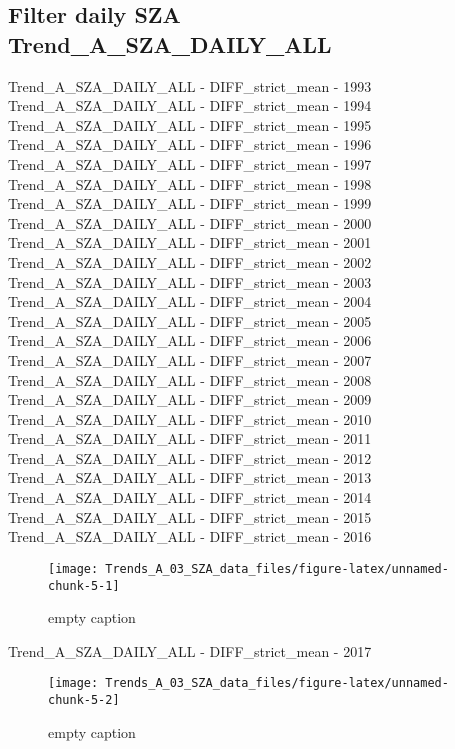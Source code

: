 \documentclass[
  10pt,
  a4paper,oneside]{article}
\begin{document}
\FloatBarrier

\hypertarget{filter-daily-sza-trend_a_sza_daily_all}{%
\subsection{Filter daily SZA Trend\_A\_SZA\_DAILY\_ALL}\label{filter-daily-sza-trend_a_sza_daily_all}}

Trend\_A\_SZA\_DAILY\_ALL - DIFF\_strict\_mean - 1993
Trend\_A\_SZA\_DAILY\_ALL - DIFF\_strict\_mean - 1994
Trend\_A\_SZA\_DAILY\_ALL - DIFF\_strict\_mean - 1995
Trend\_A\_SZA\_DAILY\_ALL - DIFF\_strict\_mean - 1996
Trend\_A\_SZA\_DAILY\_ALL - DIFF\_strict\_mean - 1997
Trend\_A\_SZA\_DAILY\_ALL - DIFF\_strict\_mean - 1998
Trend\_A\_SZA\_DAILY\_ALL - DIFF\_strict\_mean - 1999
Trend\_A\_SZA\_DAILY\_ALL - DIFF\_strict\_mean - 2000
Trend\_A\_SZA\_DAILY\_ALL - DIFF\_strict\_mean - 2001
Trend\_A\_SZA\_DAILY\_ALL - DIFF\_strict\_mean - 2002
Trend\_A\_SZA\_DAILY\_ALL - DIFF\_strict\_mean - 2003
Trend\_A\_SZA\_DAILY\_ALL - DIFF\_strict\_mean - 2004
Trend\_A\_SZA\_DAILY\_ALL - DIFF\_strict\_mean - 2005
Trend\_A\_SZA\_DAILY\_ALL - DIFF\_strict\_mean - 2006
Trend\_A\_SZA\_DAILY\_ALL - DIFF\_strict\_mean - 2007
Trend\_A\_SZA\_DAILY\_ALL - DIFF\_strict\_mean - 2008
Trend\_A\_SZA\_DAILY\_ALL - DIFF\_strict\_mean - 2009
Trend\_A\_SZA\_DAILY\_ALL - DIFF\_strict\_mean - 2010
Trend\_A\_SZA\_DAILY\_ALL - DIFF\_strict\_mean - 2011
Trend\_A\_SZA\_DAILY\_ALL - DIFF\_strict\_mean - 2012
Trend\_A\_SZA\_DAILY\_ALL - DIFF\_strict\_mean - 2013
Trend\_A\_SZA\_DAILY\_ALL - DIFF\_strict\_mean - 2014
Trend\_A\_SZA\_DAILY\_ALL - DIFF\_strict\_mean - 2015
Trend\_A\_SZA\_DAILY\_ALL - DIFF\_strict\_mean - 2016

\begin{figure}[!ht]

{\centering \texttt{[image: Trends\_A\_03\_SZA\_data\_files/figure-latex/unnamed-chunk-5-1]} 

}

\caption{ empty caption }\label{fig:unnamed-chunk-5-1}
\end{figure}

Trend\_A\_SZA\_DAILY\_ALL - DIFF\_strict\_mean - 2017

\begin{figure}[!ht]

{\centering \texttt{[image: Trends\_A\_03\_SZA\_data\_files/figure-latex/unnamed-chunk-5-2]} 

}

\caption{ empty caption }\label{fig:unnamed-chunk-5-2}
\end{figure}
\end{document}
